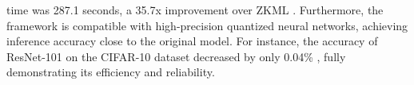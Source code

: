 \documentclass[journal]{IEEEtran}
\begin{document}
time was 287.1 seconds, a 35.7x improvement over ZKML \cite{sun2024zkllm}. Furthermore, the framework is compatible with high-precision quantized neural networks, achieving inference accuracy close to the original model. For instance, the accuracy of ResNet-101 on the CIFAR-10 dataset decreased by only 0.04\% , fully demonstrating its efficiency and reliability.



\end{document}
